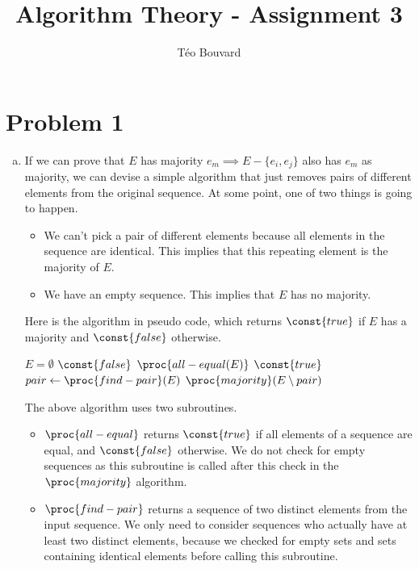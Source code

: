 \documentclass[a4paper, 10pt, twoside]{article}
\begin{document}
\title{Algorithm Theory - Assignment 3}
\author{T\'eo Bouvard}
\maketitle

\section*{Problem 1}
\begin{enumerate}[a)]
	\item If we can prove that $E$ has majority $e_m \implies E - \{e_i, e_j\}$ also has $e_m$ as majority, we can devise a simple algorithm that just removes pairs of different elements from the original sequence. At some point, one of two things is going to happen.

	      \begin{itemize}
		      \item We can't pick a pair of different elements because all elements in the sequence are identical. This implies that this repeating element is the majority of $E$.
		      \item We have an empty sequence. This implies that $E$ has no majority.
	      \end{itemize}

	      Here is the algorithm in pseudo code, which returns $\const{true}$ if $E$ has a majority and $\const{false}$ otherwise.

	      \begin{codebox}
		      \zi \If $E = \emptyset$
		      \zi \Then \Return $\const{false}$ \End
		      \zi \If $\proc{all-equal(E)}$
		      \zi \Then \Return $\const{true}$ \End
		      \zi $pair \gets \proc{find-pair}(E)$
		      \zi \Return $\proc{majority}(E \setminus pair)$ \End
	      \end{codebox}

	      The above algorithm uses two subroutines.

	      \begin{itemize}
		      \item $\proc{all-equal}$ returns $\const{true}$ if all elements of a sequence are equal, and $\const{false}$ otherwise. We do not check for empty sequences as this subroutine is called after this check in the $\proc{majority}$ algorithm.
		      \item $\proc{find-pair}$ returns a sequence of two distinct elements from the input sequence. We only need to consider sequences who actually have at least two distinct elements, because we checked for empty sets and sets containing identical elements before calling this subroutine.
	      \end{itemize}


\end{enumerate}
\end{document}
